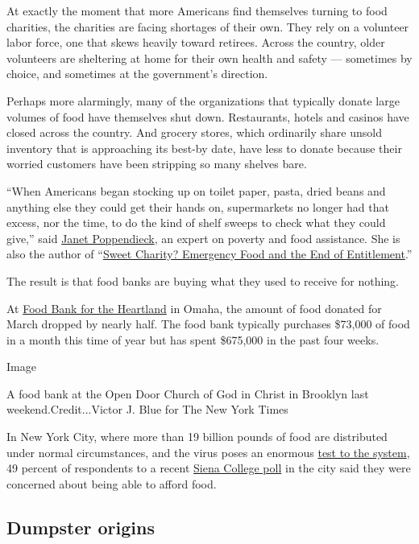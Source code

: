 At exactly the moment that more Americans find themselves turning to
food charities, the charities are facing shortages of their own. They
rely on a volunteer labor force, one that skews heavily toward retirees.
Across the country, older volunteers are sheltering at home for their
own health and safety --- sometimes by choice, and sometimes at the
government's direction.

Perhaps more alarmingly, many of the organizations that typically donate
large volumes of food have themselves shut down. Restaurants, hotels and
casinos have closed across the country. And grocery stores, which
ordinarily share unsold inventory that is approaching its best-by date,
have less to donate because their worried customers have been stripping
so many shelves bare.

``When Americans began stocking up on toilet paper, pasta, dried beans
and anything else they could get their hands on, supermarkets no longer
had that excess, nor the time, to do the kind of shelf sweeps to check
what they could give,'' said
\href{http://www.hunter.cuny.edu/sociology/faculty/janet-poppendieck}{Janet
Poppendieck}, an expert on poverty and food assistance. She is also the
author of
``\href{https://www.penguinrandomhouse.com/books/330861/sweet-charity-by-janet-poppendieck/}{Sweet
Charity? Emergency Food and the End of Entitlement}.''

The result is that food banks are buying what they used to receive for
nothing.

At \href{https://foodbankheartland.org/}{Food Bank for the Heartland} in
Omaha, the amount of food donated for March dropped by nearly half. The
food bank typically purchases \$73,000 of food in a month this time of
year but has spent \$675,000 in the past four weeks.

Image

A food bank at the Open Door Church of God in Christ in Brooklyn last
weekend.Credit...Victor J. Blue for The New York Times

In New York City, where more than 19 billion pounds of food are
distributed under normal circumstances, and the virus poses an enormous
\href{https://www.nytimes3xbfgragh.onion/2020/03/18/business/coronavirus-food-supply-kitchens.html}{test
to the system}, 49 percent of respondents to a recent
\href{https://scri.siena.edu/2020/04/06/coronavirus-crisis-changing-life-in-ny/}{Siena
College poll} in the city said they were concerned about being able to
afford food.

\hypertarget{dumpster-origins}{%
\subsection{Dumpster origins}\label{dumpster-origins}}

